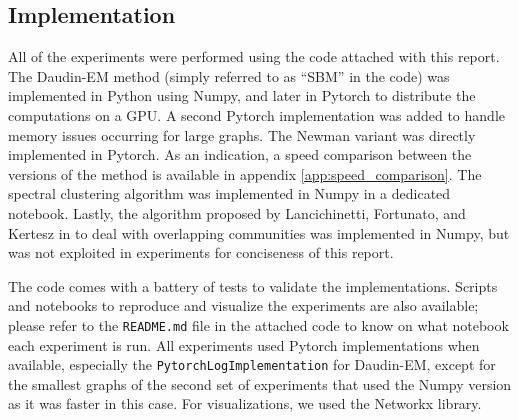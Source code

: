 \documentclass[switch, 12pt]{article}
\begin{document}
\begin{multicols}{2}
    \subsection{Implementation}

    All of the experiments were performed using the code attached with this report. The Daudin-EM method (simply referred to as ``SBM'' in the code) was implemented in Python using Numpy, and later in Pytorch to distribute the computations on a GPU. A second Pytorch implementation was added to handle memory issues occurring for large graphs. The Newman variant was directly implemented in Pytorch. As an indication, a speed comparison between the versions of the method is available in appendix \ref{app:speed_comparison}. The spectral clustering algorithm was implemented in Numpy in a dedicated notebook. Lastly, the algorithm proposed by Lancichinetti, Fortunato, and Kertesz in \cite{lancichinetti_detecting_2009} to deal with overlapping communities was implemented in Numpy, but was not exploited in experiments for conciseness of this report.

    The code comes with a battery of tests to validate the implementations. Scripts and notebooks to reproduce and visualize the experiments are also available; please refer to the \texttt{README.md} file in the attached code to know on what notebook each experiment is run. All experiments used Pytorch implementations when available, especially the \texttt{PytorchLogImplementation} for Daudin-EM, except for the smallest graphs of the second set of experiments that used the Numpy version as it was faster in this case. For visualizations, we used the Networkx library.


\end{multicols}
\end{document}
